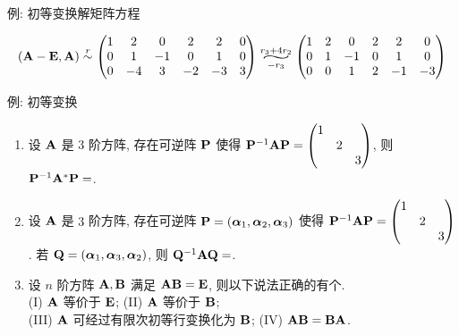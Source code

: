 \begin{frame}{例: 初等变换解矩阵方程}
	\onslide<+->
	\begin{solutionc}
		\[(\bfA-\bfE,\bfA)\simr\begin{pmatrix}
			1&2&0&2&2&0\\
			0&1&-1&0&1&0\\
			0&-4&3&-2&-3&3
		\end{pmatrix}\wsim[3]{r_3+4r_2}{-r_3}\begin{pmatrix}
			1&2&0&2&2&0\\
			0&1&-1&0&1&0\\
			0&0&1&2&-1&-3
		\end{pmatrix}\]

	\end{solutionc}
\end{frame}


\begin{frame}{例: 初等变换}
	\onslide<+->
	\begin{exercise}
		\begin{enumerate}
			\item 设 ${\mathbf{A}}$ 是 $3$ 阶方阵, 存在可逆阵 ${\mathbf{P}}$ 使得 ${\mathbf{P}}^{-1}{\mathbf{A}}{\mathbf{P}}=\begin{pmatrix}
				1&&\\&2&\\&&3
			\end{pmatrix}$, 则 ${\mathbf{P}}^{-1}{\mathbf{A}}^*{\mathbf{P}}=$.
			\item 设 ${\mathbf{A}}$ 是 $3$ 阶方阵, 存在可逆阵 ${\mathbf{P}}=({\boldsymbol{\alpha}}_1,{\boldsymbol{\alpha}}_2,{\boldsymbol{\alpha}}_3)$ 使得 ${\mathbf{P}}^{-1}{\mathbf{A}}{\mathbf{P}}=\begin{pmatrix}
				1&&\\&2&\\&&3
			\end{pmatrix}$.
			若 ${\mathbf{Q}}=({\boldsymbol{\alpha}}_1,{\boldsymbol{\alpha}}_3,{\boldsymbol{\alpha}}_2)$, 则 ${\mathbf{Q}}^{-1}{\mathbf{A}}{\mathbf{Q}}=$.
			\item 设 $n$ 阶方阵 ${\mathbf{A}},{\mathbf{B}}$ 满足 ${\mathbf{A}}{\mathbf{B}}={\mathbf{E}}$, 则以下说法正确的有个.\\
			(I) ${\mathbf{A}}$ 等价于 ${\mathbf{E}}$;\hspace{45mm}
			(II) ${\mathbf{A}}$ 等价于 ${\mathbf{B}}$;\\
			(III) ${\mathbf{A}}$ 可经过有限次初等行变换化为 ${\mathbf{B}}$;\hspace{4mm}
			(IV) ${\mathbf{A}}{\mathbf{B}}={\mathbf{B}}{\mathbf{A}}$.
		\end{enumerate}
	\end{exercise}
\end{frame}
